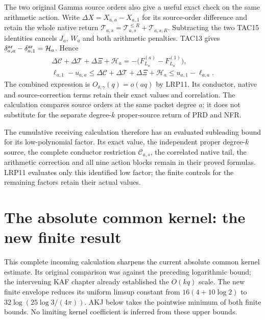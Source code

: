 \documentclass[11pt,a4paper]{article}
\begin{document}
The two original Gamma source orders also give a useful exact check
on the same arithmetic action. Write $\Delta X=X_{a,a}-X_{a,1}$
for its source-order difference and retain the whole native return
$\mathcal T_{a,s}=\mathcal T_{a,s}^{\le R}+\mathscr T_{a,s,R}$.
Subtracting the two TAC15 identities cancels $J_a$, $W_a$ and both
arithmetic penalties. TAC13 gives
$\delta_{a,a}^{\rm ar}-\delta_{a,1}^{\rm ar}=\mathcal H_a$.
Hence
\[
\begin{gathered}
 \Delta\mathcal C+\Delta\mathcal T+\Delta\Xi+\mathcal H_a
       =-\bigl(F_{L_a}^{(a)}-F_{L_a}^{(1)}\bigr),\\
 \ell_{a,1}-u_{a,a}
 \le\Delta\mathcal C+\Delta\mathcal T+\Delta\Xi+\mathcal H_a
 \le u_{a,1}-\ell_{a,a}.
\end{gathered}\tag{LRP18}
\]
The combined expression is $O_{\delta,\gamma}(q)=o(aq)$ by LRP11.
Its conductor, native and source-correction terms retain their exact
values and correlation. The calculation compares source orders at the
same packet degree $a$; it does not substitute for the separate
degree-$k$ proper-source return of PRD and NFR.

The cumulative receiving calculation therefore has an evaluated
subleading bound for its low-polynomial factor. Its exact value,
the independent proper degree-$k$ source, the complete conductor
restriction $\mathcal C_{a,s}$, the correlated native tail, the
arithmetic correction and all nine action blocks remain in their
proved formulas. LRP11 evaluates only this identified low factor;
the finite controls for the remaining factors retain their actual values.
\endgroup


\clearpage
\section{The absolute common kernel: the new finite result}
\label{sec:AKS}

This complete incoming calculation sharpens the current absolute common
kernel estimate. Its original comparison was against the preceding
logarithmic bound; the intervening KAF chapter already established
the $O(kq)$ scale. The new finite envelope reduces its uniform limsup
constant from $16(4+10\log2)$ to $32\log(25\log3/(4\pi))$.
AKJ below takes the pointwise minimum of both finite bounds. No
limiting kernel coefficient is inferred from these upper bounds.
\end{document}
